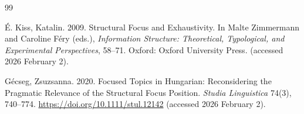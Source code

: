 \documentclass[ruler]{CUP-JNL-LIN}%
\begin{document}
\begin{Backmatter}
\begin{thebibliography}{99}

{É. Kiss, Katalin}. 2009. Structural Focus and Exhaustivity. In Malte Zimmermann and Caroline Féry (eds.), \textit{Information Structure: Theoretical, Typological, and Experimental Perspectives}, 58--71. Oxford: Oxford University Press. (accessed 2026 February 2).




{Gécseg, Zsuzsanna}. 2020. Focused Topics in Hungarian: Reconsidering the Pragmatic Relevance of the Structural Focus Position. \textit{Studia Linguistica} 74(3), 740--774. \url{https://doi.org/10.1111/stul.12142}  (accessed 2026 February 2).




\end{thebibliography}
\end{Backmatter}
\end{document}

